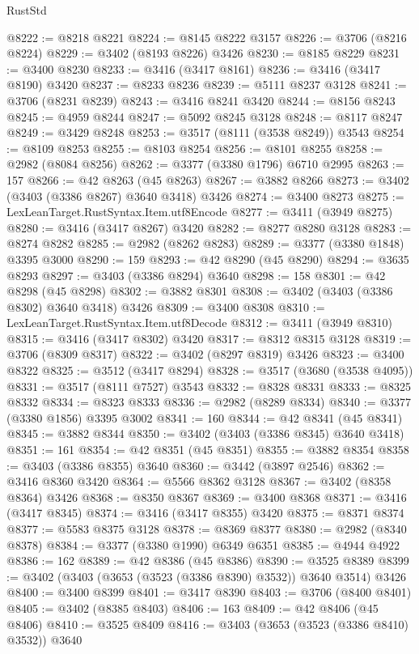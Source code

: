 \begin{lexlean}{RustStd}
\begin{coremodule}
@8222 := @8218 @8221
@8224 := @8145 @8222 @3157
@8226 := @3706 (@8216 @8224)
@8229 := @3402 (@8193 @8226) @3426
@8230 := @8185 @8229
@8231 := @3400 @8230
@8233 := @3416 (@3417 @8161)
@8236 := @3416 (@3417 @8190) @3420
@8237 := @8233 @8236
@8239 := @5111 @8237 @3128
@8241 := @3706 (@8231 @8239)
@8243 := @3416 @8241 @3420
@8244 := @8156 @8243
@8245 := @4959 @8244
@8247 := @5092 @8245 @3128
@8248 := @8117 @8247
@8249 := @3429 @8248
@8253 := @3517 (@8111 (@3538 @8249)) @3543
@8254 := @8109 @8253
@8255 := @8103 @8254
@8256 := @8101 @8255
@8258 := @2982 (@8084 @8256)
@8262 := @3377 (@3380 @1796) @6710 @2995
@8263 := 157
@8266 := @42 @8263 (@45 @8263)
@8267 := @3882 @8266
@8273 := @3402 (@3403 (@3386 @8267) @3640 @3418) @3426
@8274 := @3400 @8273
@8275 := LexLeanTarget.RustSyntax.Item.utf8Encode
@8277 := @3411 (@3949 @8275)
@8280 := @3416 (@3417 @8267) @3420
@8282 := @8277 @8280 @3128
@8283 := @8274 @8282
@8285 := @2982 (@8262 @8283)
@8289 := @3377 (@3380 @1848) @3395 @3000
@8290 := 159
@8293 := @42 @8290 (@45 @8290)
@8294 := @3635 @8293
@8297 := @3403 (@3386 @8294) @3640
@8298 := 158
@8301 := @42 @8298 (@45 @8298)
@8302 := @3882 @8301
@8308 := @3402 (@3403 (@3386 @8302) @3640 @3418) @3426
@8309 := @3400 @8308
@8310 := LexLeanTarget.RustSyntax.Item.utf8Decode
@8312 := @3411 (@3949 @8310)
@8315 := @3416 (@3417 @8302) @3420
@8317 := @8312 @8315 @3128
@8319 := @3706 (@8309 @8317)
@8322 := @3402 (@8297 @8319) @3426
@8323 := @3400 @8322
@8325 := @3512 (@3417 @8294)
@8328 := @3517 (@3680 (@3538 @4095))
@8331 := @3517 (@8111 @7527) @3543
@8332 := @8328 @8331
@8333 := @8325 @8332
@8334 := @8323 @8333
@8336 := @2982 (@8289 @8334)
@8340 := @3377 (@3380 @1856) @3395 @3002
@8341 := 160
@8344 := @42 @8341 (@45 @8341)
@8345 := @3882 @8344
@8350 := @3402 (@3403 (@3386 @8345) @3640 @3418)
@8351 := 161
@8354 := @42 @8351 (@45 @8351)
@8355 := @3882 @8354
@8358 := @3403 (@3386 @8355) @3640
@8360 := @3442 (@3897 @2546)
@8362 := @3416 @8360 @3420
@8364 := @5566 @8362 @3128
@8367 := @3402 (@8358 @8364) @3426
@8368 := @8350 @8367
@8369 := @3400 @8368
@8371 := @3416 (@3417 @8345)
@8374 := @3416 (@3417 @8355) @3420
@8375 := @8371 @8374
@8377 := @5583 @8375 @3128
@8378 := @8369 @8377
@8380 := @2982 (@8340 @8378)
@8384 := @3377 (@3380 @1990) @6349 @6351
@8385 := @4944 @4922
@8386 := 162
@8389 := @42 @8386 (@45 @8386)
@8390 := @3525 @8389
@8399 := @3402 (@3403 (@3653 (@3523 (@3386 @8390) @3532)) @3640 @3514) @3426
@8400 := @3400 @8399
@8401 := @3417 @8390
@8403 := @3706 (@8400 @8401)
@8405 := @3402 (@8385 @8403)
@8406 := 163
@8409 := @42 @8406 (@45 @8406)
@8410 := @3525 @8409
@8416 := @3403 (@3653 (@3523 (@3386 @8410) @3532)) @3640

\end{coremodule}
\end{lexlean}
